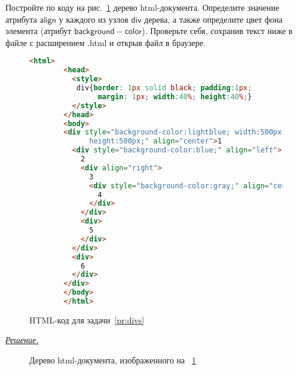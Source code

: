 \documentclass[10pt]{article}
\newcommand{\figref}[1]{\figurename~\ref{#1}}
\newcounter{pr} \setcounter{pr}{0}
\newenvironment{sol}
  {\par
   {\itshape \underline{Решение.}}}
  {}
\newcommand{\thtml}{\mathsf{html}}
\newcommand{\thead}{\mathsf{head}}
\newcommand{\tbody}{\mathsf{body}}
\newcommand{\tstyle}{\mathsf{style}}
\newcommand{\tdiv}{\mathsf{div}}
\newcommand{\aalign}{\mathsf{align}}
\newcommand{\abgcolor}{\mathsf{background-color}}
\begin{document}
  \begin{pr}\label{pr:divs}
    Постройте по коду на рис.~\ref{fig:divs} дерево html-документа. Определите значение атрибута $\aalign$ у каждого из узлов $\tdiv$ дерева, а также определите цвет фона элемента (атрибут $\abgcolor$). Проверьте себя, сохранив текст ниже в файле с расширением .html и открыв файл в браузере.
    \begin{figure}[ht!]
      \begin{lstlisting}[language=HTML]
        <html>
        <head>
          <style>
           div{border: 1px solid black; padding:1px;
                margin: 1px; width:40%; height:40%;}
          </style>
        </head>
        <body>
        <div style="background-color:lightblue; width:500px;
              height:500px;" align="center">1
          <div style="background-color:blue;" align="left">
            2
            <div align="right">
              3
              <div style="background-color:gray;" align="center">
                4
              </div>
            </div>
            <div>
              5
            </div>
          </div>
          <div>
            6
          </div>
        </div>
        </body>
        </html>
      \end{lstlisting}
      \caption{HTML-код для задачи~\ref{pr:divs}}
      \label{fig:divs}
    \end{figure}
    \begin{sol}
      \begin{figure}[ht!]
        \parbox{.3\linewidth}{
          \centering
          \caption{Дерево html-документа, изображенного на \figref{fig:divs}}
        }
        \hfill
        \parbox{.6\linewidth}{
}
\end{figure}
\end{sol}
\end{pr}
\end{document}
